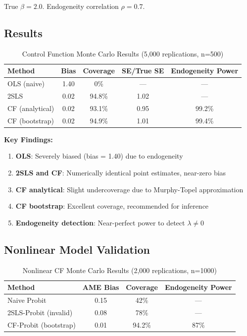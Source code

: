 True $\beta = 2.0$. Endogeneity correlation $\rho = 0.7$.

\subsection{Results}

\begin{table}[htbp]
\centering
\caption{Control Function Monte Carlo Results (5,000 replications, n=500)}
\label{tab:cf_mc}
\begin{tabular}{lcccc}
\toprule
Method & Bias & Coverage & SE/True SE & Endogeneity Power \\
\midrule
OLS (naive) & 1.40 & 0\% & --- & --- \\
2SLS & 0.02 & 94.8\% & 1.02 & --- \\
CF (analytical) & 0.02 & 93.1\% & 0.95 & 99.2\% \\
CF (bootstrap) & 0.02 & 94.9\% & 1.01 & 99.4\% \\
\bottomrule
\end{tabular}
\end{table}

\textbf{Key Findings:}
\begin{enumerate}
    \item \textbf{OLS}: Severely biased (bias = 1.40) due to endogeneity
    \item \textbf{2SLS and CF}: Numerically identical point estimates, near-zero bias
    \item \textbf{CF analytical}: Slight undercoverage due to Murphy-Topel approximation
    \item \textbf{CF bootstrap}: Excellent coverage, recommended for inference
    \item \textbf{Endogeneity detection}: Near-perfect power to detect $\lambda \neq 0$
\end{enumerate}

\subsection{Nonlinear Model Validation}

\begin{table}[htbp]
\centering
\caption{Nonlinear CF Monte Carlo Results (2,000 replications, n=1000)}
\label{tab:ncf_mc}
\begin{tabular}{lccc}
\toprule
Method & AME Bias & Coverage & Endogeneity Power \\
\midrule
Naive Probit & 0.15 & 42\% & --- \\
2SLS-Probit (invalid) & 0.08 & 78\% & --- \\
CF-Probit (bootstrap) & 0.01 & 94.2\% & 87\% \\
\bottomrule
\end{tabular}
\end{table}

